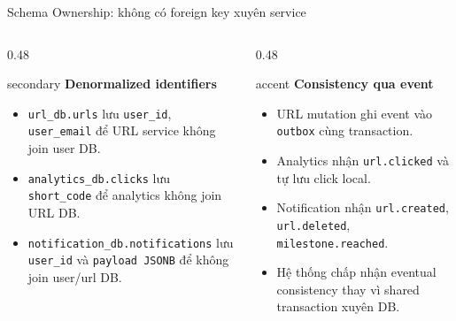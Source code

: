 \documentclass[aspectratio=169]{beamer}
\begin{document}
\begin{frame}{Schema Ownership: không có foreign key xuyên service}
    \begin{columns}[T,onlytextwidth]
        \begin{column}{0.48\textwidth}
            \begin{claimbox}{secondary}
                \textbf{Denormalized identifiers}
                \begin{itemize}\small
                    \item \texttt{url\_db.urls} lưu \texttt{user\_id}, \texttt{user\_email} để URL service không join user DB.
                    \item \texttt{analytics\_db.clicks} lưu \texttt{short\_code} để analytics không join URL DB.
                    \item \texttt{notification\_db.notifications} lưu \texttt{user\_id} và \texttt{payload JSONB} để không join user/url DB.
                \end{itemize}
            \end{claimbox}
        \end{column}
        \begin{column}{0.48\textwidth}
            \begin{claimbox}{accent}
                \textbf{Consistency qua event}
                \begin{itemize}\small
                    \item URL mutation ghi event vào \texttt{outbox} cùng transaction.
                    \item Analytics nhận \texttt{url.clicked} và tự lưu click local.
                    \item Notification nhận \texttt{url.created}, \texttt{url.deleted}, \texttt{milestone.reached}.
                    \item Hệ thống chấp nhận eventual consistency thay vì shared transaction xuyên DB.
                \end{itemize}
            \end{claimbox}
        \end{column}
    \end{columns}
\end{frame}
\end{document}
